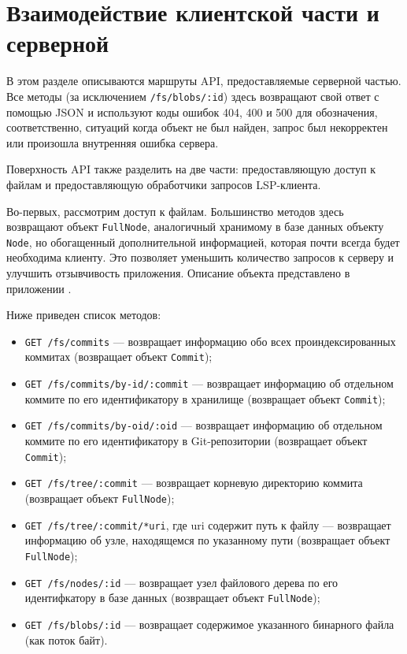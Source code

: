 \section{Взаимодействие клиентской части и серверной}
\label{section:api}

В этом разделе описываются маршруты API, предоставляемые серверной частью. Все методы (за исключением \texttt{/fs/blobs/:id}) здесь возвращают свой ответ с помощью JSON и используют коды ошибок 404, 400 и 500 для обозначения, соответственно, ситуаций когда объект не был найден, запрос был некорректен или произошла внутренняя ошибка сервера.

Поверхность API также разделить на две части: предоставляющую доступ к файлам и предоставляющую обработчики запросов LSP-клиента.

Во-первых, рассмотрим доступ к файлам. Большинство методов здесь возвращают объект \texttt{FullNode}, аналогичный хранимому в базе данных объекту \texttt{Node}, но обогащенный дополнительной информацией, которая почти всегда будет необходима клиенту. Это позволяет уменьшить количество запросов к серверу и улучшить отзывчивость приложения. Описание объекта представлено в приложении .

Ниже приведен список методов:

\begin{itemize}
    \item \texttt{GET /fs/commits} — возвращает информацию обо всех проиндексированных коммитах (возвращает объект \texttt{Commit});
    \item \texttt{GET /fs/commits/by-id/:commit} — возвращает информацию об отдельном коммите по его идентификатору в хранилище (возвращает объект \texttt{Commit});
    \item \texttt{GET /fs/commits/by-oid/:oid} — возвращает информацию об отдельном коммите по его идентификатору в Git-репозитории (возвращает объект \texttt{Commit});
    \item \texttt{GET /fs/tree/:commit} — возвращает корневую директорию коммита (возвращает объект \texttt{FullNode});
    \item \texttt{GET /fs/tree/:commit/*uri}, где uri содержит путь к файлу — возвращает информацию об узле, находящемся по указанному пути (возвращает объект \texttt{FullNode});
    \item \texttt{GET /fs/nodes/:id} — возвращает узел файлового дерева по его идентифкатору в базе данных (возвращает объект \texttt{FullNode});
    \item \texttt{GET /fs/blobs/:id} — возвращает содержимое указанного бинарного файла (как поток байт).
\end{itemize}

